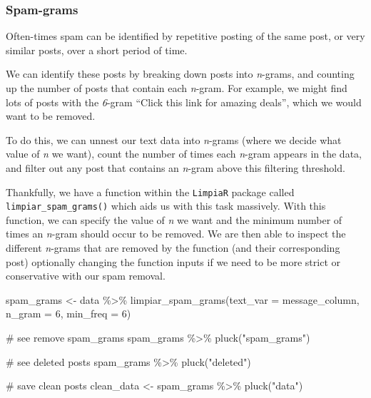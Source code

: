 \documentclass[
  letterpaper,
  DIV=11,
  numbers=noendperiod]{scrreprt}
\newenvironment{Shaded}{\begin{snugshade}}{\end{snugshade}}
\newcommand{\AttributeTok}[1]{\textcolor[rgb]{0.40,0.45,0.13}{#1}}
\newcommand{\CommentTok}[1]{\textcolor[rgb]{0.37,0.37,0.37}{#1}}
\newcommand{\DecValTok}[1]{\textcolor[rgb]{0.68,0.00,0.00}{#1}}
\newcommand{\FunctionTok}[1]{\textcolor[rgb]{0.28,0.35,0.67}{#1}}
\newcommand{\NormalTok}[1]{\textcolor[rgb]{0.00,0.23,0.31}{#1}}
\newcommand{\OtherTok}[1]{\textcolor[rgb]{0.00,0.23,0.31}{#1}}
\newcommand{\SpecialCharTok}[1]{\textcolor[rgb]{0.37,0.37,0.37}{#1}}
\newcommand{\StringTok}[1]{\textcolor[rgb]{0.13,0.47,0.30}{#1}}
\begin{document}
\subsubsection{Spam-grams}\label{spam-grams}

Often-times spam can be identified by repetitive posting of the same
post, or very similar posts, over a short period of time.

We can identify these posts by breaking down posts into \emph{n}-grams,
and counting up the number of posts that contain each \emph{n}-gram. For
example, we might find lots of posts with the \emph{6}-gram ``Click this
link for amazing deals'', which we would want to be removed.

To do this, we can unnest our text data into \emph{n}-grams (where we
decide what value of \emph{n} we want), count the number of times each
\emph{n}-gram appears in the data, and filter out any post that contains
an \emph{n}-gram above this filtering threshold.

Thankfully, we have a function within the \texttt{LimpiaR} package
called \texttt{limpiar\_spam\_grams()} which aids us with this task
massively. With this function, we can specify the value of \emph{n} we
want and the minimum number of times an \emph{n}-gram should occur to be
removed. We are then able to inspect the different \emph{n}-grams that
are removed by the function (and their corresponding post) optionally
changing the function inputs if we need to be more strict or
conservative with our spam removal.

\begin{Shaded}
\begin{Highlighting}[]
\NormalTok{spam\_grams }\OtherTok{\textless{}{-}}\NormalTok{ data }\SpecialCharTok{\%\textgreater{}\%} 
  \FunctionTok{limpiar\_spam\_grams}\NormalTok{(}\AttributeTok{text\_var =}\NormalTok{ message\_column,}
                     \AttributeTok{n\_gram =} \DecValTok{6}\NormalTok{,}
                     \AttributeTok{min\_freq =} \DecValTok{6}\NormalTok{)}

\CommentTok{\# see remove spam\_grams}
\NormalTok{spam\_grams }\SpecialCharTok{\%\textgreater{}\%} 
  \FunctionTok{pluck}\NormalTok{(}\StringTok{"spam\_grams"}\NormalTok{)}

\CommentTok{\# see deleted posts}
\NormalTok{spam\_grams }\SpecialCharTok{\%\textgreater{}\%} 
  \FunctionTok{pluck}\NormalTok{(}\StringTok{"deleted"}\NormalTok{)}

\CommentTok{\# save \textquotesingle{}clean\textquotesingle{} posts}
\NormalTok{clean\_data }\OtherTok{\textless{}{-}}\NormalTok{ spam\_grams }\SpecialCharTok{\%\textgreater{}\%} 
  \FunctionTok{pluck}\NormalTok{(}\StringTok{"data"}\NormalTok{)}
\end{Highlighting}
\end{Shaded}
\end{document}
